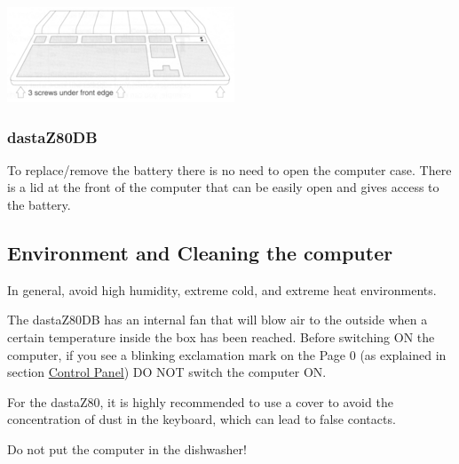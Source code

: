         \centerline{\includegraphics[scale=1]{images/keyboardscrews.png}}

        \subsubsection{dastaZ80DB}

        To replace/remove the battery there is no need to open the computer case.
        There is a lid at the front of the computer that can be easily open and
        gives access to the battery.


    \subsection{Environment and Cleaning the computer}

    In general, avoid high humidity, extreme cold, and extreme heat environments.

    The dastaZ80DB has an internal fan that will blow air to the outside when a
    certain temperature inside the box has been reached. Before switching ON the
    computer, if you see a blinking exclamation mark on the Page 0 (as explained
    in section \hyperref[subsubsec:controlpanel]{Control Panel}) DO NOT switch
    the computer ON.

    For the dastaZ80, it is highly recommended to use a cover to avoid the
    concentration of dust in the keyboard, which can lead to false contacts.

    Do not put the computer in the dishwasher!